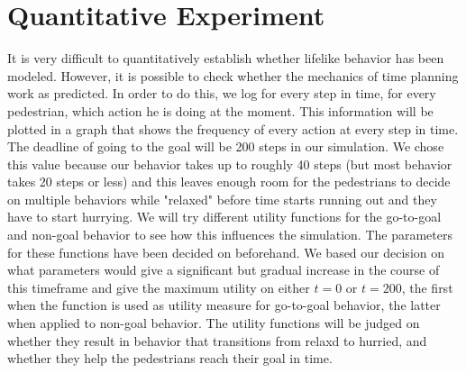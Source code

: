 \documentclass[11pt, a4paper]{book}
\begin{document}


\section{Quantitative Experiment}
It is very difficult to quantitatively establish whether lifelike behavior has been modeled. However, it is possible to check whether the mechanics of time planning work as predicted. In order to do this, we log for every step in time, for every pedestrian, which action he is doing at the moment. This information will be plotted in a graph that shows the frequency of every action at every step in time. The deadline of going to the goal will be 200 steps in our simulation. We chose this value because our behavior takes up to roughly 40 steps (but most behavior takes 20 steps or less) and this leaves enough room for the pedestrians to decide on multiple behaviors while "relaxed" before time starts running out and they have to start hurrying.
We will try different utility functions for the go-to-goal and non-goal behavior to see how this influences the simulation. The parameters for these functions have been decided on beforehand. We based our decision on what parameters would give a significant but gradual increase in the course of this timeframe and give the maximum utility on either $t=0$ or $t=200$, the first when the function is used as utility measure for go-to-goal behavior, the latter when applied to non-goal behavior. The utility functions will be judged on whether they result in behavior that transitions from relaxd to hurried, and whether they help the pedestrians reach their goal in time.
\end{document}
